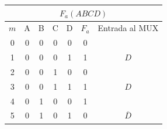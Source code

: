 \begin{center}
\begin{tabular}{ccccccc}
\multicolumn{7}{c}{\cellcolor[HTML]{FFFFC7}$F_a(ABCD)$}                                                                                                                                                                                                                       \\ \hline
\multicolumn{1}{c|}{\cellcolor[HTML]{9AFF99}$m$} & \cellcolor[HTML]{ECF4FF}A & \cellcolor[HTML]{ECF4FF}B & \cellcolor[HTML]{ECF4FF}C & \multicolumn{1}{c|}{\cellcolor[HTML]{ECF4FF}D} & \multicolumn{1}{c|}{\cellcolor[HTML]{FFCCC9}$F_a$} & Entrada al MUX                   \\ \hline
\multicolumn{1}{c|}{0}                           & 0                         & 0                         & 0                         & \multicolumn{1}{c|}{0}                         & \multicolumn{1}{c|}{0}                             &                                  \\
\multicolumn{1}{c|}{1}                           & 0                         & 0                         & 0                         & \multicolumn{1}{c|}{1}                         & \multicolumn{1}{c|}{1}                             & \multirow{-2}{*}{$D$}            \\ \hline
\multicolumn{1}{c|}{2}                           & 0                         & 0                         & 1                         & \multicolumn{1}{c|}{0}                         & \multicolumn{1}{c|}{0}                             &                                  \\
\multicolumn{1}{c|}{3}                           & 0                         & 0                         & 1                         & \multicolumn{1}{c|}{1}                         & \multicolumn{1}{c|}{1}                             & \multirow{-2}{*}{$D$}            \\ \hline
\multicolumn{1}{c|}{4}                           & 0                         & 1                         & 0                         & \multicolumn{1}{c|}{0}                         & \multicolumn{1}{c|}{1}                             &                                  \\
\multicolumn{1}{c|}{5}                           & 0                         & 1                         & 0                         & \multicolumn{1}{c|}{1}                         & \multicolumn{1}{c|}{0}                             & \multirow{-2}{*}{$\overline{D}$} \\ \hline

\end{tabular}
\end{center}
